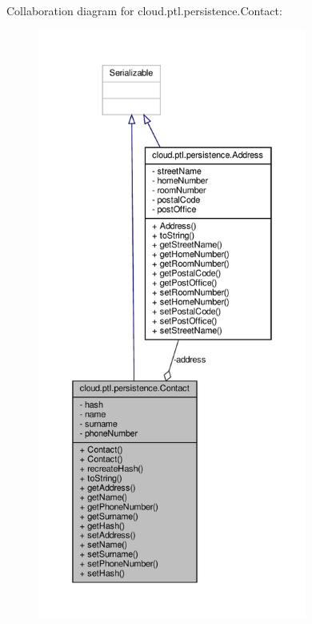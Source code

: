 Collaboration diagram for cloud.\+ptl.\+persistence.\+Contact\+:
\nopagebreak
\begin{figure}[H]
\begin{center}
\leavevmode
\includegraphics[height=550pt]{classcloud_1_1ptl_1_1persistence_1_1Contact__coll__graph}
\end{center}
\end{figure}
